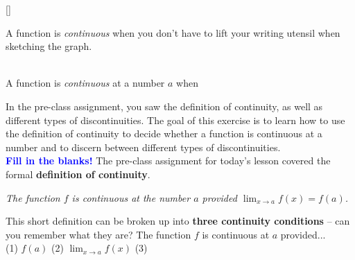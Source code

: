\documentclass[10pt]{article}
\begin{document}
[]{
\begin{center}{\bf {}} \end{center}
A function is {\em continuous} when you don't have to lift your writing utensil when sketching the graph.
~\\
{\bf{}}
}{
\begin{center}\\
A function is {\em continuous} at a number $a$  when \\
\centering {}\end{center}
}



\mod In the pre-class assignment, you saw the definition of continuity, as well as different types of discontinuities. The goal of this exercise is to learn how to use the definition of continuity to decide whether a function is continuous at a number and to discern between different types of discontinuities.\\

{\bf \textcolor{blue}{Fill in the blanks!}} The pre-class assignment for today's lesson covered the formal {\bf definition of continuity}. 
\begin{center}
{\it The function $f$ is continuous at the number $a$ provided $\displaystyle\lim_{x\to a} f(x)=f(a)$.} \\ %
\end{center}

\bigskip

This short definition can be broken up into {\bf three continuity conditions} -- can you remember what they are? The function $f$ is continuous at $a$ provided...  \\
(1) $f(a)$   \hfill
%
(2) $\displaystyle\lim_{x\to a}f(x)$ \hfill
%
(3)  \\[0.3in]
\end{document}
